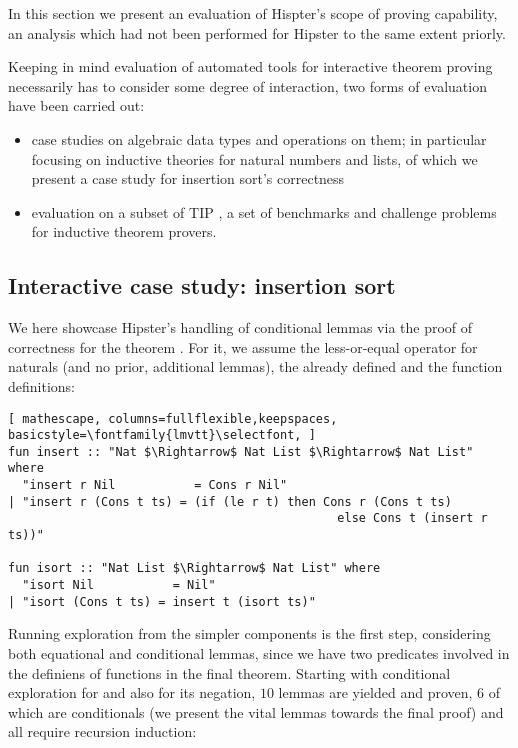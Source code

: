 \label{sec:evaluation}

In this section we present an evaluation of Hispter's scope of proving capability, an analysis which had not been performed for Hipster to the same extent priorly.

Keeping in mind evaluation of automated tools for interactive theorem proving necessarily has to consider some degree of interaction, two forms of evaluation have been carried out:

\begin{itemize}
\item case studies on algebraic data types and operations on them; in particular focusing on inductive theories for natural numbers and lists, of which we present a case study for insertion sort's correctness

\item evaluation on a subset of TIP \cite{tip-benchmarks}, a set of benchmarks and challenge problems for inductive theorem provers.
\end{itemize}

\subsection{Interactive case study: insertion sort}

We here showcase Hipster's handling of conditional lemmas via the proof of correctness for the theorem .
%
For it, we assume the less-or-equal operator  for naturals (and no prior, additional lemmas), the already defined  and the function definitions:

\begin{lstlisting}[ mathescape, columns=fullflexible,keepspaces, basicstyle=\fontfamily{lmvtt}\selectfont, ]
fun insert :: "Nat $\Rightarrow$ Nat List $\Rightarrow$ Nat List" where
  "insert r Nil           = Cons r Nil"
| "insert r (Cons t ts) = (if (le r t) then Cons r (Cons t ts)	
                                              else Cons t (insert r ts))"

fun isort :: "Nat List $\Rightarrow$ Nat List" where
  "isort Nil           = Nil"
| "isort (Cons t ts) = insert t (isort ts)"
\end{lstlisting}

Running exploration from the simpler components is the first step, considering both equational and conditional lemmas, since we have two predicates involved in the definiens of functions in the final theorem.
%
Starting with conditional exploration for  and also for its negation, $10$ lemmas are yielded and proven, $6$ of which are conditionals (we present the vital lemmas towards the final proof) and all require recursion induction:

